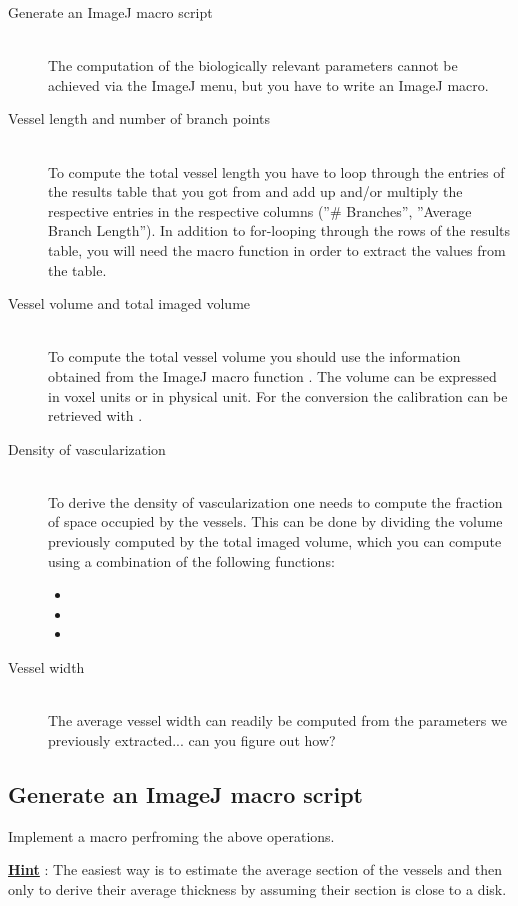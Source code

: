 \begin{description}
\item[Generate an ImageJ macro script]\hfill\\
The computation of the biologically relevant parameters cannot be achieved via the ImageJ menu, but you have to write an ImageJ macro.
\item[Vessel length and number of branch points]\hfill\\
To compute the total vessel length you have to loop through the entries of the results table that you got from  and add up and/or multiply the respective entries in the respective columns (''\# Branches'', ''Average Branch Length''). In addition to for-looping through the rows of the results table, you will need the  macro function in order to extract the values from the table.
\item[Vessel volume and total imaged volume]\hfill\\
To compute the total vessel volume you should use the information obtained from the ImageJ macro function . The volume can be expressed in voxel units or in physical unit. For the conversion the calibration can be retrieved with .

\item[Density of vascularization]\hfill\\
To derive the density of vascularization one needs to compute the fraction of space occupied by the vessels. This can be done by dividing the volume previously computed by the total imaged volume, which you can compute using a combination of the following functions:
\begin{itemize}
\item {}
\item {}
\item {}
\end{itemize}
\item[Vessel width]\hfill\\
The average vessel width can readily be computed from the parameters we previously extracted... can you figure out how?

\end{description}

\subsection{Generate an ImageJ macro script}

Implement a macro perfroming the above operations.

\textbf{\underline{Hint}} : The easiest way is to estimate the average section of the vessels and then only to derive their average thickness by assuming their section is close to a disk.
